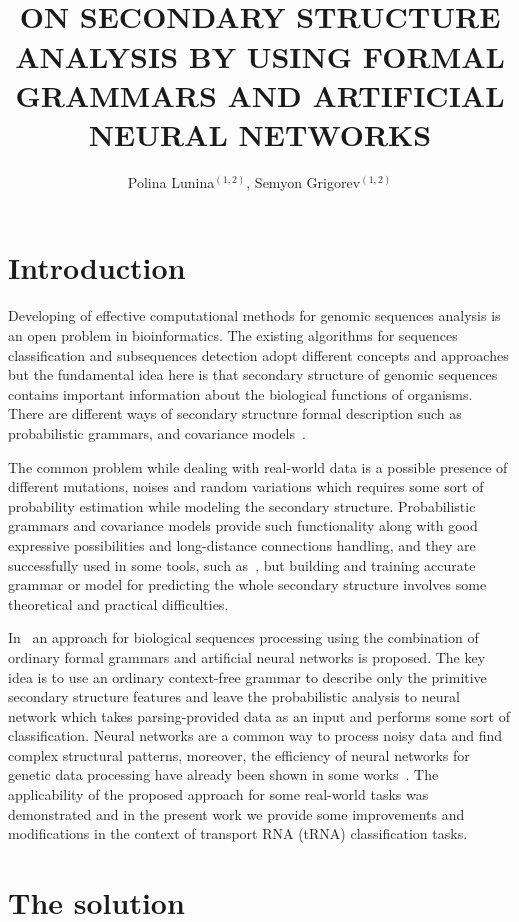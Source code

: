 \documentclass[12pt,a4paper]{cibb}
\title{\large $\ $\\ \bf ON SECONDARY STRUCTURE ANALYSIS BY USING FORMAL GRAMMARS AND ARTIFICIAL NEURAL NETWORKS}
\author{ Polina Lunina$^{(1,2)}$, Semyon Grigorev$^{(1,2)}$}
\begin{document}
\thispagestyle{myheadings}
\pagestyle{myheadings}



\section{\bf Introduction}

Developing of effective computational methods for genomic sequences analysis is an open problem in bioinformatics.
The existing algorithms for sequences classification and subsequences detection adopt different concepts and approaches but the fundamental idea here is that secondary structure of genomic sequences contains important information about the biological functions of organisms.
There are different ways of secondary structure formal description such as probabilistic grammars, and covariance models~\cite{EddyDurbin,dowell2004evaluation,knudsen1999rna}.

The common problem while dealing with real-world data is a possible presence of different mutations, noises and random variations which requires some sort of probability estimation while modeling the secondary structure.
Probabilistic grammars and covariance models provide such functionality along with good expressive possibilities and long-distance connections handling, and they are successfully used in some tools, such as~\cite{Infernal}, but building and training accurate grammar or model for predicting the whole secondary structure involves some theoretical and practical difficulties.

In~\cite{grigorevcomposition} an approach for biological sequences processing using the combination of ordinary formal grammars and artificial neural networks is proposed.
The key idea is to use an ordinary context-free grammar to describe only the primitive secondary structure features and leave the probabilistic analysis to neural network which takes parsing-provided data as an input and performs some sort of classification.
Neural networks are a common way to process noisy data and find complex structural patterns, moreover, the efficiency of neural networks for genetic data processing have already been shown in some works~\cite{Humidor,ANN}.
The applicability of the proposed approach for some real-world tasks was demonstrated and in the present work we provide some improvements and modifications in the context of transport RNA (tRNA) classification tasks.

\section{\bf The solution}
\end{document}
